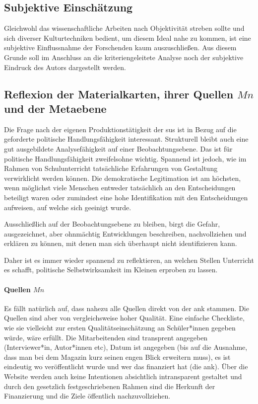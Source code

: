 \subsection{Subjektive Einschätzung}
Gleichwohl das wissenschaftliche Arbeiten nach Objektivität streben sollte und sich diverser Kulturtechniken bedient, um diesem Ideal nahe zu kommen, ist eine subjektive Einflussnahme der Forschenden kaum auszuschließen. Aus diesem Grunde soll im Anschluss an %
die kriteriengeleitete Analyse noch der subjektive Eindruck des Autors dargestellt werden. 

\subsection{Reflexion der Materialkarten, ihrer Quellen $Mn$ und der Metaebene}
Die Frage nach der eigenen Produktionstätigkeit der \gls{sus} ist in Bezug auf die geforderte politische Handlungsfähigkeit interessant. Strukturell bleibt auch eine gut ausgebildete Analysefähigkeit auf einer Beobachtungsebene. Das ist für politische Handlungsfähigkeit zweifelsohne wichtig. Spannend ist jedoch, wie im Rahmen von Schulunterricht tatsächliche Erfahrungen von Gestaltung verwirklicht werden können. Die demokratische Legitimation ist am höchsten, wenn möglichst viele Menschen entweder tatsächlich an den Entscheidungen beteiligt waren oder zumindest eine hohe Identifikation mit den Entscheidungen aufweisen, auf welche sich geeinigt wurde. 

Ausschließlich auf der Beobachtungsebene zu bleiben, birgt die Gefahr, ausgezeichnet, aber ohnmächtig Entwicklungen beschreiben, nachvollziehen und erklären zu können, mit denen man sich überhaupt nicht identifizieren kann. 

Daher ist es immer wieder spannend zu reflektieren, an welchen Stellen Unterricht es schafft, politische Selbstwirksamkeit im Kleinen erproben zu lassen.  


\paragraph{Quellen  $Mn$}
Es fällt natürlich auf, dass nahezu alle Quellen direkt von der \gls{ank} stammen.
Die Quellen sind aber von vergleichsweise hoher Qualität. Eine einfache Checkliste, wie sie vielleicht zur ersten Qualitätseinschätzung an Schüler*innen gegeben würde, wäre erfüllt. Die Mitarbeitenden sind transprent angegeben (Interviewer*in, Autor*innen \gls{etc}), Datum  ist angegeben (bis auf die Ausnahme, dass man bei dem Magazin kurz seinen engen Blick erweitern muss), es ist eindeutig wo veröffentlicht wurde und wer das finanziert hat (die \gls{ank}). Über die Website werden auch keine Intentionen absichtlich intransparent gestaltet und durch den gesetzlich festgeschriebenen Rahmen sind die Herkunft der Finanzierung und die Ziele öffentlich nachzuvollziehen. 

